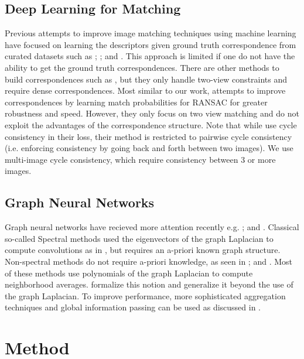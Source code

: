 \documentclass{article} %
\begin{document}
\subsection{Deep Learning for Matching}
Previous attempts to improve image matching techniques using machine learning have focused on learning the descriptors given ground truth correspondence from curated datasets such as \cite{zagoruyko2015learning}; \cite{yi2016lift}; and \cite{brachmann2017dsac}.
This approach is limited if one do not have the ability to get the ground truth correspondences.
There are other methods to build correspondences such as \cite{choy2016universal}, but they only handle two-view constraints and require dense correspondences.
Most similar to our work, \cite{yi2018learning} attempts to improve correspondences by learning match probabilities for RANSAC for greater robustness and speed.
However, they only focus on two view matching and do not exploit the advantages of the correspondence structure.
Note that while \cite{zhu2017unpaired} use cycle consistency in their loss, their method is restricted to pairwise cycle consistency (i.e. enforcing consistency by going back and forth between two images).
We use multi-image cycle consistency, which require consistency between 3 or more images.

\subsection{Graph Neural Networks}
Graph neural networks have recieved more attention recently e.g. \cite{bronstein2017geometric, bruna2013spectral, defferrard2016convolutional, kipf2017semi, scarselli2009graph, gama2018mimo, gama2018convolutional}; and \cite{battaglia2018relational}.
Classical so-called Spectral methods used the eigenvectors of the graph Laplacian to compute convolutions as in \cite{bruna2013spectral}, but requires an a-priori known graph structure. 
Non-spectral methods do not require a-priori knowledge, as seen in \cite{bronstein2017geometric, kipf2017semi, scarselli2009graph}; and \cite{gama2018convolutional}.
Most of these methods use polynomials of the graph Laplacian to compute neighborhood averages.
\cite{gama2018mimo, gama2018convolutional} formalize this notion and generalize it beyond the use of the graph Laplacian.
To improve performance, more sophisticated aggregation techniques and global information passing can be used as discussed in \cite{battaglia2018relational}.

\section{Method}
\end{document}
